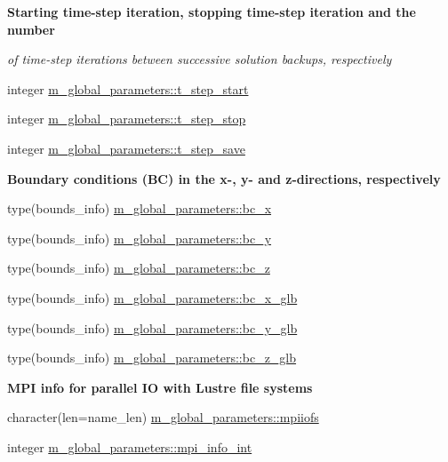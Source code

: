 \begin{Indent}\textbf{ Starting time-\/step iteration, stopping time-\/step iteration and the number}\par
{\em of time-\/step iterations between successive solution backups, respectively }\begin{DoxyCompactItemize}
\item 
integer \hyperlink{namespacem__global__parameters_ace0c8a67825d0dccd2e23b5d0f9985c0}{m\+\_\+global\+\_\+parameters\+::t\+\_\+step\+\_\+start}
\item 
integer \hyperlink{namespacem__global__parameters_aff1140575af25247060f3e7f31a8a10f}{m\+\_\+global\+\_\+parameters\+::t\+\_\+step\+\_\+stop}
\item 
integer \hyperlink{namespacem__global__parameters_a98b51eda2c46660b439c0a8375385165}{m\+\_\+global\+\_\+parameters\+::t\+\_\+step\+\_\+save}
\end{DoxyCompactItemize}
\end{Indent}
\begin{Indent}\textbf{ Boundary conditions (BC) in the x-\/, y-\/ and z-\/directions, respectively}\par
\begin{DoxyCompactItemize}
\item 
type(bounds\+\_\+info) \hyperlink{namespacem__global__parameters_aa46a7f3638e49fa9ec33ea859b9e6a5a}{m\+\_\+global\+\_\+parameters\+::bc\+\_\+x}
\item 
type(bounds\+\_\+info) \hyperlink{namespacem__global__parameters_a68eaaca2982b39252417b29ef5d0f9c3}{m\+\_\+global\+\_\+parameters\+::bc\+\_\+y}
\item 
type(bounds\+\_\+info) \hyperlink{namespacem__global__parameters_a6769808569174ff0eef096e958889837}{m\+\_\+global\+\_\+parameters\+::bc\+\_\+z}
\item 
type(bounds\+\_\+info) \hyperlink{namespacem__global__parameters_a18f8ba3144b698c2753731b6e27fc581}{m\+\_\+global\+\_\+parameters\+::bc\+\_\+x\+\_\+glb}
\item 
type(bounds\+\_\+info) \hyperlink{namespacem__global__parameters_ac480f572058786c13c3e94efb6496a71}{m\+\_\+global\+\_\+parameters\+::bc\+\_\+y\+\_\+glb}
\item 
type(bounds\+\_\+info) \hyperlink{namespacem__global__parameters_aeb29c88b4fa96ec8edcfed6c42861280}{m\+\_\+global\+\_\+parameters\+::bc\+\_\+z\+\_\+glb}
\end{DoxyCompactItemize}
\end{Indent}
\begin{Indent}\textbf{ M\+PI info for parallel IO with Lustre file systems}\par
\begin{DoxyCompactItemize}
\item 
character(len=name\+\_\+len) \hyperlink{namespacem__global__parameters_ad4713c1e89eaa8fac3bb2181ba87b192}{m\+\_\+global\+\_\+parameters\+::mpiiofs}
\item 
integer \hyperlink{namespacem__global__parameters_a2663d07998d11d25e223cd7ad0bbd748}{m\+\_\+global\+\_\+parameters\+::mpi\+\_\+info\+\_\+int}
\end{DoxyCompactItemize}
\end{Indent}
